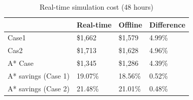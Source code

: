 \begin{table}[htb]
\centering
\caption{Real-time simulation cost (48 hours)}
\label{tab:rt_cost}
\begin{tabular}{l|l|l|l|}
\cline{2-4}
                                          & Real-time & Offline & Difference \\ \hline
\multicolumn{1}{|l|}{Case1}               & \$1,662   & \$1,579 & 4.99\%     \\ \hline
\multicolumn{1}{|l|}{Cas2}                & \$1,713   & \$1,628 & 4.96\%     \\ \hline
\multicolumn{1}{|l|}{A* Case}             & \$1,345   & \$1,286 & 4.39\%     \\ \hline
\multicolumn{1}{|l|}{A* savings (Case 1)} & 19.07\%   & 18.56\% & 0.52\%     \\ \hline
\multicolumn{1}{|l|}{A* savings (Case 2)} & 21.48\%   & 21.01\% & 0.48\%     \\ \hline
\end{tabular}
\end{table}